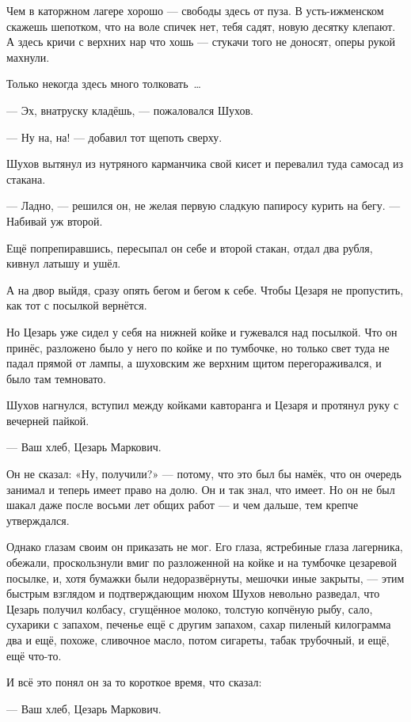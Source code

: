 Чем в каторжном лагере хорошо --- свободы здесь от пуза. В усть-ижменском скажешь шепотком, что на воле спичек нет, тебя садят, новую десятку клепают. А здесь кричи с верхних нар что хошь --- стукачи того не доносят, оперы рукой махнули.

Только некогда здесь много толковать~\dots{}

--- Эх, внатруску кладёшь, --- пожаловался Шухов.

--- Ну на, на! --- добавил тот щепоть сверху.

Шухов вытянул из нутряного карманчика свой кисет и перевалил туда самосад из стакана.

--- Ладно, --- решился он, не желая первую сладкую папиросу курить на бегу. --- Набивай уж второй.

Ещё попрепиравшись, пересыпал он себе и второй стакан, отдал два рубля, кивнул латышу и ушёл.

А на двор выйдя, сразу опять бегом и бегом к себе. Чтобы Цезаря не пропустить, как тот с посылкой вернётся.

Но Цезарь уже сидел у себя на нижней койке и гужевался над посылкой. Что он принёс, разложено было у него по койке и по тумбочке, но только свет туда не падал прямой от лампы, а шуховским же верхним щитом перегораживался, и было там темновато.

Шухов нагнулся, вступил между койками кавторанга и Цезаря и протянул руку с вечерней пайкой.

--- Ваш хлеб, Цезарь Маркович.

Он не сказал: «Ну, получили?» --- потому, что это был бы намёк, что он очередь занимал и теперь имеет право на долю. Он и так знал, что имеет. Но он не был шакал даже после восьми лет общих работ --- и чем дальше, тем крепче утверждался.

Однако глазам своим он приказать не мог. Его глаза, ястребиные глаза лагерника, обежали, проскользнули вмиг по разложенной на койке и на тумбочке цезаревой посылке, и, хотя бумажки были недоразвёрнуты, мешочки иные закрыты, --- этим быстрым взглядом и подтверждающим нюхом Шухов невольно разведал, что Цезарь получил колбасу, сгущённое молоко, толстую копчёную рыбу, сало, сухарики с запахом, печенье ещё с другим запахом, сахар пиленый килограмма два и ещё, похоже, сливочное масло, потом сигареты, табак трубочный, и ещё, ещё что-то.

И всё это понял он за то короткое время, что сказал:

--- Ваш хлеб, Цезарь Маркович.

